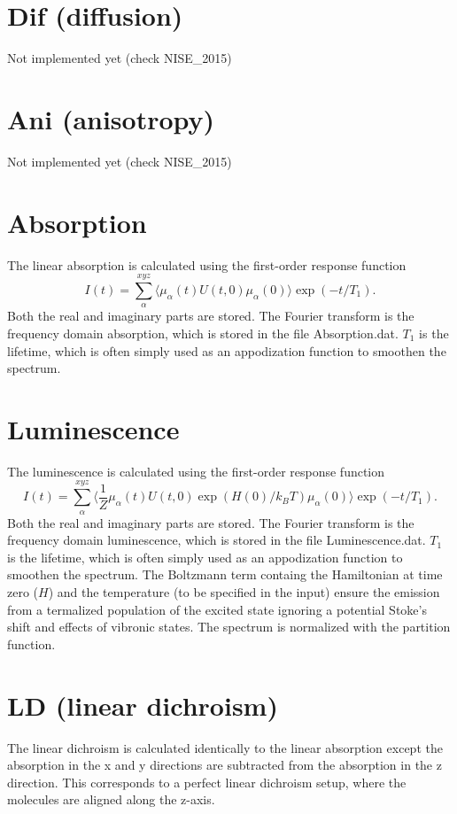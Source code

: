 \section{Dif (diffusion)}
Not implemented yet (check NISE\_2015)
\section{Ani (anisotropy)}
Not implemented yet (check NISE\_2015)
\section{Absorption}
The linear absorption is calculated using the first-order response function
\begin{equation}
	I(t)=\sum_{\alpha}^{xyz}\langle\mu_{\alpha}(t)U(t,0)\mu_{\alpha}(0)\rangle\exp(-t/T_1).
\end{equation}
Both the real and imaginary parts are stored. The Fourier transform is the frequency domain absorption, which is stored in the file Absorption.dat. $T_1$ is the lifetime, which is often simply used as an appodization function to smoothen the spectrum. 
\section{Luminescence}
The luminescence is calculated using the first-order response function
\begin{equation}
	I(t)=\sum_{\alpha}^{xyz}\langle\frac{1}{Z}\mu_{\alpha}(t)U(t,0)\exp(H(0)/k_BT)\mu_{\alpha}(0)\rangle\exp(-t/T_1).
\end{equation}
Both the real and imaginary parts are stored. The Fourier transform is the frequency domain luminescence, which is stored in the file Luminescence.dat. $T_1$ is the lifetime, which is often simply used as an appodization function to smoothen the spectrum. The Boltzmann term containg the Hamiltonian at time zero ($H$) and the temperature (to be specified in the input) ensure the emission from a termalized population of the excited state ignoring a potential Stoke's shift and effects of vibronic states. The spectrum is normalized with the partition function. 
\section{LD (linear dichroism)}
The linear dichroism is calculated identically to the linear absorption except the absorption in the x and y directions are subtracted from the absorption in the z direction. This corresponds to a perfect linear dichroism setup, where the molecules are aligned along the z-axis.
